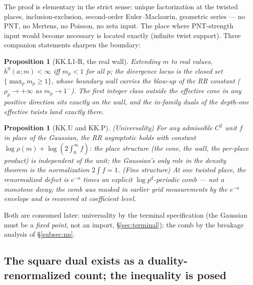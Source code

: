 \documentclass[11pt,reqno]{amsart}
\theoremstyle{plain}
\newtheorem{proposition}[theorem]{Proposition}
\theoremstyle{definition}
\theoremstyle{remark}
\begin{document}
The proof is elementary in the strict sense: unique factorization at the twisted places,
inclusion-exclusion, second-order Euler--Maclaurin, geometric series --- no PNT, no Mertens,
no Poisson, no zeta input. The place where PNT-strength input would become necessary is
located exactly (infinite twist support). Three companion statements sharpen the boundary:

\begin{proposition}[KK.L1-R, the real wall]\label{prop:kkr}
Extending $m$ to real values, $h^0(a; m) < \infty$ iff $m_p < 1$ for all $p$; the divergence
locus is the closed set $\{\max_p m_p \ge 1\}$, whose boundary wall carries the blow-up of
the RR constant ($\rho_p \to +\infty$ as $m_p \to 1^-$). The first integer class outside the
effective cone in any positive direction sits exactly on the wall, and the in-family duals
of the depth-one effective twists land exactly there.
\end{proposition}

\begin{proposition}[KK.U and KK.P]\label{prop:kku}
\textup{(Universality)} For any admissible $C^2$ unit $f$ in place of the Gaussian, the RR
asymptotic holds with constant $\log\rho(m) + \log(2\!\int_0^\infty\! f)$: the place
structure (the cone, the wall, the per-place product) is independent of the unit; the
Gaussian's only role in the density theorem is the normalization $2\!\int f = 1$.
\textup{(Fine structure)} At one twisted place, the renormalized defect is $e^{-a}$ times an
explicit $\log p^d$-periodic comb --- not a monotone decay; the comb was masked in earlier
grid measurements by the $e^{-a}$ envelope and is recovered at coefficient level.
\end{proposition}

Both are consumed later: universality by the terminal specification (the Gaussian must be a
\emph{fixed point}, not an import, \S\ref{sec:terminal}); the comb by the breakage analysis
of \S\ref{subsec:nn}.

\subsection{The square dual exists as a duality-renormalized count; the inequality is posed}
\label{subsec:ll}
\end{document}
